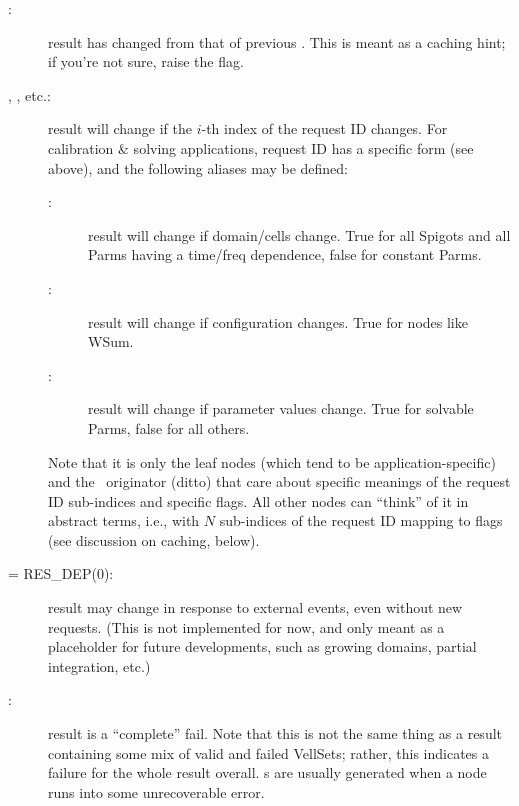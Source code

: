 \documentclass[10pt]{article}
\begin{document}
  \begin{description}
  
  \item[:] result has changed from that of previous \Request. This
     is meant as a caching hint; if you're not sure, raise the flag.

  \item[, , etc.:] result will change if the $i$-th
    index of the request ID changes. For calibration \& solving applications,
    request ID has a specific form (see above), and the following aliases may
    be defined:

    \begin{description}
    
    \item[:] result will change if domain/cells
      change. True for all Spigots and all Parms having a time/freq dependence,
      false for constant Parms.

    \item[:] result will change if configuration
      changes. True for nodes like WSum.

    \item[:] result will change if parameter values
      change. True for solvable Parms, false for all others.

    \end{description}
    
    Note that it is only the leaf nodes (which tend to be application-specific)
    and the \Request\ originator (ditto) that care about specific meanings of
    the request ID sub-indices and specific  flags. All other nodes
    can ``think'' of it in abstract terms, i.e., with $N$ sub-indices of the
    request ID mapping to flags (see discussion on caching, below).

  \item[ = RES\_DEP(0):] result may change in response to
    external events, even without new requests. (This is not implemented for
    now, and only meant as a placeholder for future developments, such as
    growing domains, partial integration, etc.)

  \item[:] result is a ``complete'' fail. Note that this is not the
    same thing as a result containing some mix of valid and failed VellSets;
    rather, this indicates a failure for the whole result overall. s
    are usually generated when a node runs into some unrecoverable error.
    

\end{description}
\end{document}
